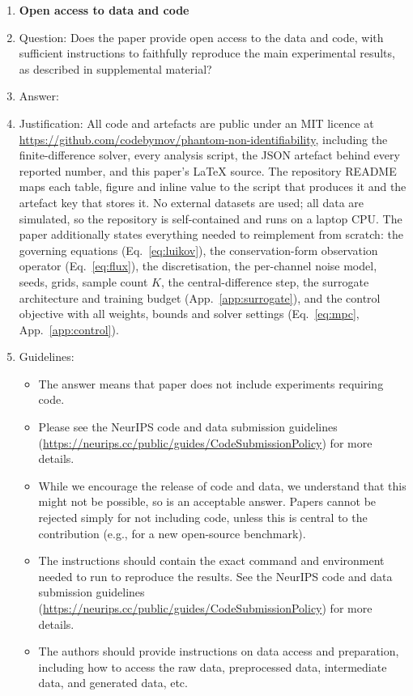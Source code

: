 \begin{enumerate}
\item {\bf Open access to data and code}
    \item[] Question: Does the paper provide open access to the data and code, with sufficient instructions to faithfully reproduce the main experimental results, as described in supplemental material?
    \item[] Answer: \answerYes{} %
    \item[] Justification: All code and artefacts are public under an MIT licence at \url{https://github.com/codebymov/phantom-non-identifiability}, including the finite-difference solver, every analysis script, the JSON artefact behind every reported number, and this paper's LaTeX source. The repository README maps each table, figure and inline value to the script that produces it and the artefact key that stores it. No external datasets are used; all data are simulated, so the repository is self-contained and runs on a laptop CPU. The paper additionally states everything needed to reimplement from scratch: the governing equations (Eq.~\ref{eq:luikov}), the conservation-form observation operator (Eq.~\ref{eq:flux}), the discretisation, the per-channel noise model, seeds, grids, sample count $K$, the central-difference step, the surrogate architecture and training budget (App.~\ref{app:surrogate}), and the control objective with all weights, bounds and solver settings (Eq.~\ref{eq:mpc}, App.~\ref{app:control}).
    \item[] Guidelines:
    \begin{itemize}
        \item The answer \answerNA{} means that paper does not include experiments requiring code.
        \item Please see the NeurIPS code and data submission guidelines (\url{https://neurips.cc/public/guides/CodeSubmissionPolicy}) for more details.
        \item While we encourage the release of code and data, we understand that this might not be possible, so \answerNo{} is an acceptable answer. Papers cannot be rejected simply for not including code, unless this is central to the contribution (e.g., for a new open-source benchmark).
        \item The instructions should contain the exact command and environment needed to run to reproduce the results. See the NeurIPS code and data submission guidelines (\url{https://neurips.cc/public/guides/CodeSubmissionPolicy}) for more details.
        \item The authors should provide instructions on data access and preparation, including how to access the raw data, preprocessed data, intermediate data, and generated data, etc.

\end{itemize}
\end{enumerate}
